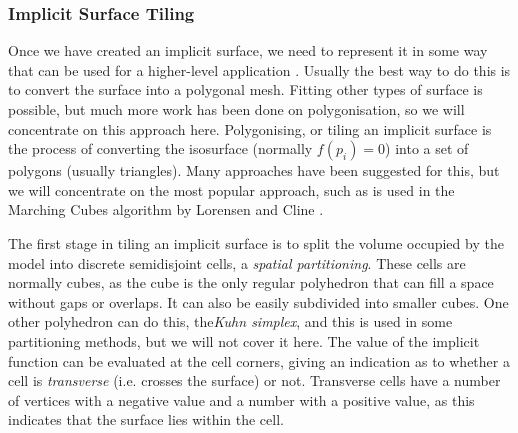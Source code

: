 \documentclass[10pt,oneside,fleqn,a4paper]{book}
\begin{document}
\subsubsection{Implicit Surface Tiling}
Once we have created an implicit surface, we need to represent it in some way that can be used for a higher-level application \cite{Bloomenthal97}. Usually the best way to do this is to convert the surface into a polygonal mesh. Fitting other types of surface is possible, but much more work has been done on polygonisation, so we will concentrate on this approach here. Polygonising, or tiling an implicit surface is the process of converting the isosurface (normally $f(p_i)=0$) into a set of polygons (usually triangles). Many approaches have been suggested for this, but we will concentrate on the most popular approach, such as is used in the Marching Cubes algorithm by Lorensen and Cline \cite{Lorensen87}.

The first stage in tiling an implicit surface is to split the volume occupied by the model into discrete semidisjoint cells, a {\it spatial partitioning}. These cells are normally cubes, as the cube is the only regular polyhedron that can fill a space without gaps or overlaps. It can also be easily subdivided into smaller cubes. One other polyhedron can do this, the{\it Kuhn simplex}, and this is used in some partitioning methods, but we will not cover it here. The value of the implicit function can be evaluated at the cell corners, giving an indication as to whether a cell is {\it transverse} (i.e. crosses the surface) or not. Transverse cells have a number of vertices with a negative value and a number with a positive value, as this indicates that the surface lies within the cell.
\end{document}
